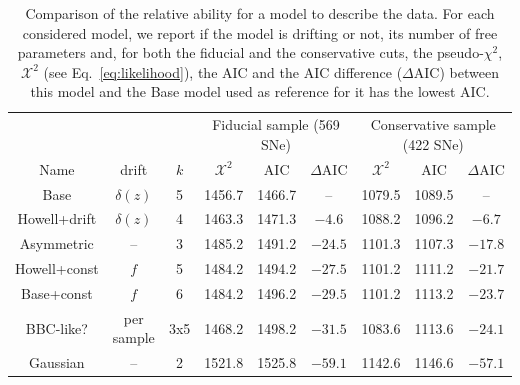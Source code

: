 \documentclass[]{aa} %
\newcommand{\yc}[1]{{\textcolor{BrickRed}{#1}}}
\begin{document}
\begin{table}
\centering
\caption{Comparison of the relative ability for a model to describe the
data. For each considered model, we report if the model is drifting or not,
its number of free parameters and, for both the fiducial and the conservative
cuts, the pseudo-$\chi^2$, $\mathcal{X}^2$ (see Eq.~\ref{eq:likelihood}), the AIC
and the AIC difference ($\Delta$AIC) between this model and the Base model used
as reference for it has the lowest AIC.}
    \label{tab:comp}
    \begin{tabular}{ccc|ccc|ccc}
    \hline\hline%
        & & & \multicolumn{3}{c}{Fiducial sample (569 SNe)} & \multicolumn{3}{|c}{Conservative sample (422 SNe)} \\
        Name & drift & $k$ &
        $\mathcal{X}^2$ & AIC & $\Delta \mathrm{AIC}$ & $\mathcal{X}^2$ & $\mathrm{AIC}$ & $\Delta \mathrm{AIC}$\\%
        \hline%

        Base & $\delta(z)$ & 5
        & 1456.7 & 1466.7 & -- 
        & 1079.5 & 1089.5 & -- \\%

        Howell+drift & $\delta(z)$ & 4
        & 1463.3 & 1471.3 & $-4.6$  %
        & 1088.2 & 1096.2 & $-6.7$ 
        \\%

        Asymmetric & -- & 3
        & 1485.2 & 1491.2 & $-24.5$  %
        & 1101.3 & 1107.3 & $-17.8$ 
        \\%

        Howell+const & $f$ & 5
        & 1484.2 & 1494.2 & $-27.5$  %
        & 1101.2 & 1111.2 & $-21.7$ 
        \\%

        Base+const & $f$ & 6
        & 1484.2 & 1496.2 & $-29.5$  %
        & 1101.2 & 1113.2 & $-23.7$ 
        \\%

        \yc{BBC-like?} & per sample & 3x5
        & 1468.2 & 1498.2 & $-31.5$  %
        & 1083.6 & 1113.6 & $-24.1$ 
        \\%

        Gaussian & -- & 2
        & 1521.8 & 1525.8 & $-59.1$  %
        & 1142.6 & 1146.6 & $-57.1$ 
        \\
        \hline
    \end{tabular}
\end{table}
\end{document}

